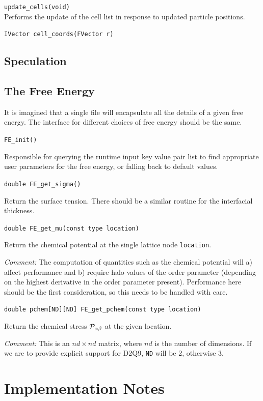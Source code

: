 \texttt{update\_cells(void)}\\
Performs the update of the cell list in response to updated
particle positions.

\texttt{IVector cell\_coords(FVector r)}\\




\subsection{Speculation}

\subsection{The Free Energy}

It is imagined that a single file will encapsulate all the details
of a given free energy. The interface for different choices of
free energy should be the same.


\texttt{FE\_init()}

Responsible for querying the runtime input key value pair list to
find appropriate user parameters for the free energy, or
falling back to default values.


\texttt{double FE\_get\_sigma()}

Return the surface tension. There should be a similar routine
for the interfacial thickness.

\texttt{double FE\_get\_mu(const type location)}

Return the chemical potential at the single lattice
node \texttt{location}.

\textit{Comment:} The computation of quantities such as the chemical
potential will a) affect performance and b) require halo values of
the order parameter (depending on the highest derivative
in the order parameter present). Performance here should be the
first consideration, so this needs to be handled with care.


\texttt{double pchem[ND][ND] FE\_get\_pchem(const type location)}

Return the chemical stress ${\cal P}_{\alpha\beta}$ at the
given location.

\textit{Comment:} This is an $nd \times nd$ matrix, where $nd$ is
the number of dimensions. If we are to provide explicit support for
D2Q9, \texttt{ND} will be 2, otherwise 3.





\section{Implementation Notes}

